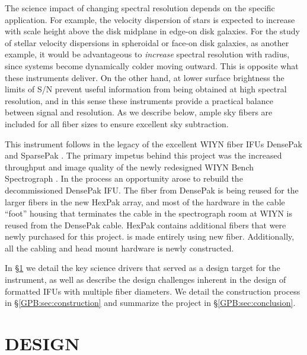 The science impact of changing spectral resolution depends on the specific
application.  For example, the velocity dispersion of stars is expected to
increase with scale height above the disk midplane in edge-on disk galaxies.
For the study of stellar velocity dispersions in spheroidal or face-on disk
galaxies, as another example, it would be advantageous to \emph{increase}
spectral resolution with radius, since systems become dynamically colder
moving outward.  This is opposite what these instruments deliver.  On the
other hand, at lower surface brightness the limits of S/N prevent useful
information from being obtained at high spectral resolution, and in this sense
these instruments provide a practical balance between signal and resolution.
As we describe below, ample sky fibers are included for all fiber sizes to
ensure excellent sky subtraction.

This instrument follows in the legacy of the excellent WIYN fiber IFUs
DensePak \citep{Barden98} and SparsePak \citep{Bershady04,Bershady05}.  The
primary impetus behind this project was the increased throughput and image
quality of the newly redesigned WIYN Bench Spectrograph
\citep{Barden94,Bershady08,Knezek10}.  In the process an opportunity arose to
rebuild the decommissioned DensePak IFU.  The fiber from DensePak is being
reused for the larger fibers in the new HexPak array, and most of the hardware
in the cable ``foot'' housing that terminates the cable in the spectrograph
room at WIYN is reused from the DensePak cable.  HexPak contains additional
fibers that were newly purchased for this project.  \GP is made entirely using
new fiber.  Additionally, all the cabling and head mount hardware is newly
constructed.


In \S\ref{GPB:sec:design} we detail the key science drivers that served as a
design target for the instrument, as well as describe the design challenges
inherent in the design of formatted IFUs with multiple fiber diameters.  We
detail the construction process in \S\ref{GPB:sec:construction} and summarize the
project in \S\ref{GPB:sec:conclusion}.

\section{DESIGN} 
\label{GPB:sec:design}
